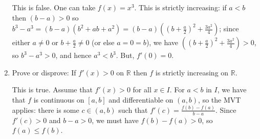 \documentclass[12pt]{amsart}
\newcommand{\R}{{\mathbb{R}}}
\numberwithin{equation}{section}
\theoremstyle{plain} %
\theoremstyle{definition}
\theoremstyle{remark}
\begin{document}
\begin{enumerate}
\begin{framed}
This is false. One can take $f(x)=x^3$. This is strictly increasing: if $a<b$ then $(b-a)>0$ so $b^3-a^3= (b-a)(b^2+ab+a^2) = (b-a)((b+\frac {a}{2})^2+\frac{3 a^2}{4})$; since either $a\neq 0$ or $b+\frac{a}{2}\neq 0$ (or else $a=0=b$), we have $((b+\frac {a}{2})^2+\frac{3 a^2}{4})>0$, so $b^3-a^3>0$, and hence $a^3<b^3$. But, $f'(0)=0$.
\end{framed}

\item Prove or disprove: If $f'(x)>0$ on $\R$ then $f$ is strictly increasing on $\R$.
\begin{framed}
This is true. Assume that $f'(x) > 0$ for all $x\in I$. For $a<b$ in $I$, we have that $f$ is continuous on $[a,b]$ and differentiable on $(a,b)$, so the MVT applies: there is some $c\in (a,b)$ such that $f'(c) = \frac{f(b)-f(a)}{b-a}$. Since $f'(c) > 0$ and $b-a>0$, we must have $f(b)-f(a)> 0$, so $f(a) \leq f(b)$.
\end{framed}
\end{enumerate}
\end{document}
